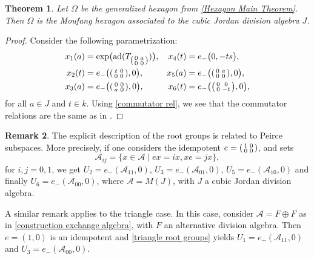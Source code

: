 \documentclass[oneside,a4paper]{amsart} %
\newtheorem{theorem}{Theorem}[section]
\theoremstyle{definition}
\newtheorem{remark}[theorem]{Remark}
\DeclareMathOperator{\ad}{ad}
\newcommand{\A}{\mathcal{A}}
\numberwithin{equation}{section}
\begin{document}
\begin{theorem}\label{hexagon root groups}
	Let $\Omega$ be the generalized hexagon from \cref{Hexagon Main Theorem}. Then $\Omega$ is the Moufang hexagon associated to the cubic Jordan division algebra $J$.
\end{theorem}
\begin{proof}
	Consider the following parametrization:
	\begin{align*}
		x_1(a) &= \exp \bigl( \ad(T_{\begin{psmallmatrix} 0&a\\0&0 \end{psmallmatrix}}) \bigr), &
		x_4(t) &= e_- \bigl( 0,-ts \bigr), \\
		x_2(t) &= e_- \bigl(\begin{psmallmatrix} t &0\\0&0 \end{psmallmatrix},0 \bigr), &
		x_5(a) &= e_- \bigl(\begin{psmallmatrix} 0 &a\\0&0 \end{psmallmatrix},0 \bigr), \\
		x_3(a) &= e_- \bigl(\begin{psmallmatrix} 0 &0\\a&0 \end{psmallmatrix},0 \bigr), &
		x_6(t) &= e_- \bigl(\begin{psmallmatrix} 0 &0\\0&-t \end{psmallmatrix},0 \bigr),
	\end{align*}
	for all $a\in J$ and $t\in k$.
	Using \cref{commutator rel}, we see that the commutator relations are the same as in \cite[(16.8)]{Tits2002}. 
\end{proof}

\begin{remark}
	The explicit description of the root groups is related to Peirce subspaces. 
	More precisely, if one considers the idempotent $e=\begin{psmallmatrix} 1 &0\\0&0 \end{psmallmatrix}$, and sets 
	\[ \A_{ij}=\{x\in\A\mid ex=ix, xe=jx\},\]
	for $i,j=0,1$, we get $U_2=e_-(\A_{11},0)$, $U_3=e_-(\A_{01},0)$, $U_5=e_-(\A_{10},0)$ and finally $U_6=e_-(\A_{00},0)$, where $\A=M(J)$, with $J$ a cubic Jordan division algebra.
	
	A similar remark applies to the triangle case. 
	In this case, consider $\A=F\oplus F$ as in \cref{construction exchange algebra}, with $F$ an alternative division algebra.
	Then $e=(1,0)$ is an idempotent and \cref{triangle root groups} yields $U_1=e_-(\A_{11},0)$ and $U_3=e_-(\A_{00},0)$.
\end{remark}




\end{document}
